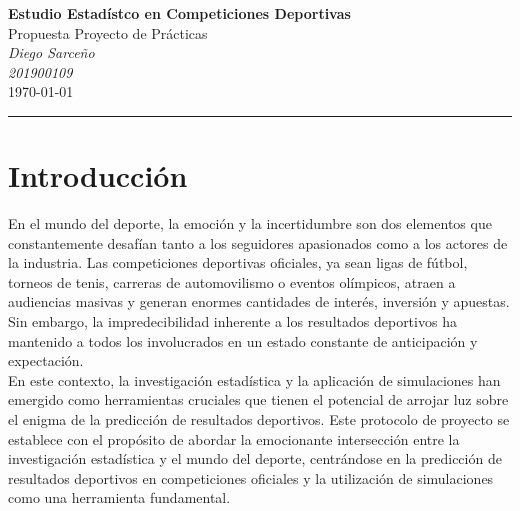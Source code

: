 \begin{titlepage}
%

\textcolor{DS_Black}{
\begin{minipage}{0.85\textwidth}
    \begin{center}
        \textbf{\Large Estudio Estadístco en Competiciones Deportivas}\\
        \vspace{5pt}
        Propuesta Proyecto de Prácticas \\
        \vspace{20pt}
        \textit{Diego Sarceño} \\
        \vspace{5pt}
        \footnotesize{\textit{201900109}} \\
        \vspace{5pt}
        \today
    \end{center}
\end{minipage}
\vspace{10pt}
\hrule
}


%


\section{Introducción}

En el mundo del deporte, la emoción y la incertidumbre son dos elementos que constantemente desafían tanto a los seguidores apasionados como a los actores de la industria. Las competiciones deportivas oficiales, ya sean ligas de fútbol, torneos de tenis, carreras de automovilismo o eventos olímpicos, atraen a audiencias masivas y generan enormes cantidades de interés, inversión y apuestas. Sin embargo, la impredecibilidad inherente a los resultados deportivos ha mantenido a todos los involucrados en un estado constante de anticipación y expectación. \\

En este contexto, la investigación estadística y la aplicación de simulaciones han emergido como herramientas cruciales que tienen el potencial de arrojar luz sobre el enigma de la predicción de resultados deportivos. Este protocolo de proyecto se establece con el propósito de abordar la emocionante intersección entre la investigación estadística y el mundo del deporte, centrándose en la predicción de resultados deportivos en competiciones oficiales y la utilización de simulaciones como una herramienta fundamental. \\



\end{titlepage}
